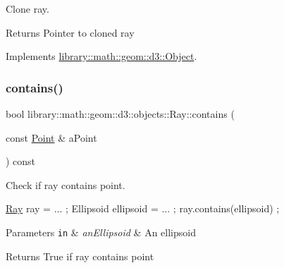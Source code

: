Clone ray. 

\begin{DoxyReturn}{Returns}
Pointer to cloned ray 
\end{DoxyReturn}


Implements \hyperlink{classlibrary_1_1math_1_1geom_1_1d3_1_1_object_a1a784c6b359e0eb97cd34fabc42f2f3f}{library\+::math\+::geom\+::d3\+::\+Object}.

\mbox{\label{classlibrary_1_1math_1_1geom_1_1d3_1_1objects_1_1_ray_a6179dc1453ac7a54b13fe6bf46c0a66b}} 
\subsubsection{\texorpdfstring{contains()}{contains()}}
{\footnotesize\ttfamily bool library\+::math\+::geom\+::d3\+::objects\+::\+Ray\+::contains (\begin{DoxyParamCaption}\item[{const \hyperlink{classlibrary_1_1math_1_1geom_1_1d3_1_1objects_1_1_point}{Point} \&}]{a\+Point }\end{DoxyParamCaption}) const}



Check if ray contains point. 


\begin{DoxyCode}
\hyperlink{classlibrary_1_1math_1_1geom_1_1d3_1_1objects_1_1_ray_a11b7613464daaebc6e25a758b057f203}{Ray} ray = ... ;
Ellipsoid ellipsoid = ... ;
ray.contains(ellipsoid) ;
\end{DoxyCode}



\begin{DoxyParams}[1]{Parameters}
\mbox{\tt in}  & {\em an\+Ellipsoid} & An ellipsoid \\
\hline
\end{DoxyParams}
\begin{DoxyReturn}{Returns}
True if ray contains point 
\end{DoxyReturn}
\mbox{\label{classlibrary_1_1math_1_1geom_1_1d3_1_1objects_1_1_ray_ab2e0a6cfd7c2c288ec615a479024fb7d}} 
